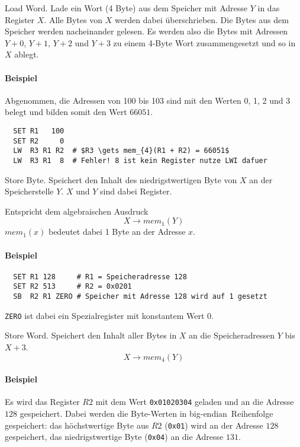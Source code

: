 \glqq Load Word\grqq.
Lade ein Wort (4 Byte) aus dem Speicher mit Adresse $Y$ in das Register $X$.
Alle Bytes von $X$ werden dabei überschrieben.
Die Bytes aus dem Speicher werden nacheinander gelesen. Es werden also die
Bytes mit Adressen $Y + 0$, $Y + 1$, $Y + 2$ und $Y + 3$ zu
einem 4-Byte Wort zusammengesetzt und so in $X$ ablegt.

\paragraph{Beispiel}
Abgenommen, die Adressen von 100 bis 103 sind mit den Werten 0, 1, 2 und 3
belegt und bilden somit den Wert $66051$.
\begin{lstlisting}
  SET R1   100
  SET R2     0
  LW  R3 R1 R2  # $R3 \gets mem_{4}(R1 + R2) = 66051$
  LW  R3 R1  8  # Fehler! 8 ist kein Register nutze LWI dafuer
\end{lstlisting}




\glqq Store Byte\grqq.
Speichert den Inhalt des niedrigstwertigen Byte von $X$ an der Speicherstelle
$Y$. $X$ und $Y$ sind dabei Register.

Entspricht dem algebraischen Ausdruck
\[
    X \to mem_{1} (Y)
\]
$mem_{1}(x)$ bedeutet dabei 1 Byte an der Adresse $x$.

\paragraph{Beispiel}
\begin{lstlisting}
  SET R1 128     # R1 = Speicheradresse 128
  SET R2 513     # R2 = 0x0201
  SB  R2 R1 ZERO # Speicher mit Adresse 128 wird auf 1 gesetzt
\end{lstlisting}
\texttt{ZERO} ist dabei ein Spezialregister mit konstantem Wert $0$.




\glqq Store Word\grqq.
Speichert den Inhalt aller Bytes in $X$ an die Speicheradressen $Y$ bis 
$X + 3$.
\[
    X \to mem_{4}(Y)
\]
\paragraph{Beispiel}
Es wird das Register $R2$ mit dem Wert \texttt{0x01020304} geladen und an die
Adresse $128$ gespeichert. Dabei werden die Byte-Werten in 
\glqq big-endian\grqq\ Reihenfolge gespeichert: das höchstwertige Byte aus $R2$
(\texttt{0x01}) wird an der Adresse $128$ gespeichert, das niedrigstwertige
Byte (\texttt{0x04}) an die Adresse $131$.

